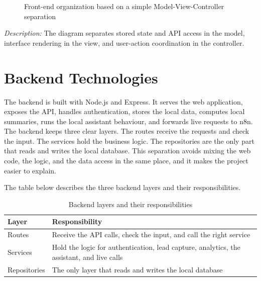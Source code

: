 \documentclass[12pt,a4paper,oneside]{report}
\newcommand{\figdesc}[1]{%
\vspace{-0.05cm}\noindent\small\textit{Description:} #1\par\normalsize\vspace{0.30cm}%
}
\begin{document}
\begin{figure}[H]
\centering
{}
\caption{Front-end organization based on a simple Model-View-Controller separation}
\end{figure}
\figdesc{The diagram separates stored state and API access in the model, interface rendering in the view, and user-action coordination in the controller.}

\section{Backend Technologies}\label{sumlbl:c4s4}
The backend is built with Node.js and Express. It serves the web application, exposes the API, handles authentication, stores the local data, computes local summaries, runs the local assistant behaviour, and forwards live requests to n8n. The backend keeps three clear layers. The routes receive the requests and check the input. The services hold the business logic. The repositories are the only part that reads and writes the local database. This separation avoids mixing the web code, the logic, and the data access in the same place, and it makes the project easier to explain.

The table below describes the three backend layers and their responsibilities.

\begin{table}[H]
\centering
\begin{tabularx}{\textwidth}{|p{3.6cm}|X|}
\hline\rowcolor{TabHead}
\textbf{Layer} & \textbf{Responsibility} \\
\hline
Routes & Receive the API calls, check the input, and call the right service \\
\hline
Services & Hold the logic for authentication, lead capture, analytics, the assistant, and live calls \\
\hline
Repositories & The only layer that reads and writes the local database \\
\hline
\end{tabularx}
\caption{Backend layers and their responsibilities}
\end{table}
\end{document}
